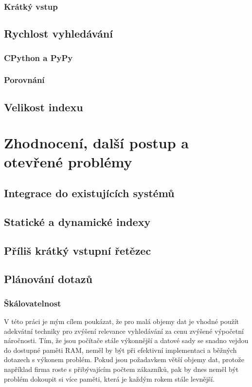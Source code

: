 \documentclass[12pt,letterpaper,oneside,openright]{book}
\begin{document}
\subsection{Krátký vstup}

\section{Rychlost vyhledávání}
\subsection{CPython a PyPy}
\subsection{Porovnání}

\section{Velikost indexu}

\chapter{Zhodnocení, další postup a otevřené problémy}
\section{Integrace do existujících systémů}
\section{Statické a dynamické indexy}
\section{Příliš krátký vstupní řetězec}
\section{Plánování dotazů}
\subsection{Škálovatelnost}
V této práci je mým cílem poukázat, že pro malá objemy dat je vhodné použít
adekvátní techniky pro zvýšení relevance vyhledávání za cenu zvýšené výpočetní
náročnosti. Tím, že jsou počítače stále výkonnější a datové sady se snadno
vejdou do dostupné paměti RAM, neměl by být při efektivní implementaci a
běžných dotazech s výkonem problém. Pokud jsou požadavkem větší objemy dat,
protože například firma roste s přibývajícím počtem zákazníků, pak by dnes
neměl být problém dokoupit si více paměti, která je každým rokem stále levnější.
\end{document}
